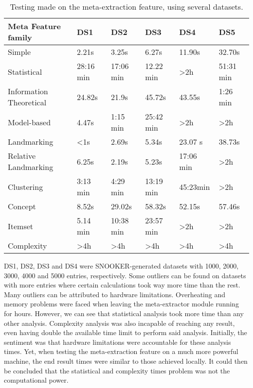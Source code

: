 \begin{table}[h!]
  \centering
  \caption{Testing made on the meta-extraction feature, using several datasets. }
  \setlength{\tabcolsep}{8pt}
    \renewcommand{\arraystretch}{1.2}
      \begin{tabular}{llllll}
        \hline
        Meta Feature family     & DS1       & DS2       & DS3       & DS4       & DS5 \\ \hline
        Simple                  & 2.21s     & 3.25s     & 6.27s     & 11.90s    & 32.70s\\
        Statistical             & 28:16 min & 17:06 min & 12.22 min & >2h       & 51:31 min\\
        Information Theoretical & 24.82s    & 21.9s     & 45.72s    & 43.55s    & 1:26 min\\
        Model-based             & 4.47s     & 1:15 min  & 25:42 min & >2h       & >2h \\
        Landmarking             & <1s       & 2.69s     & 5.34s     & 23.07 s   & 38.73s \\
        Relative Landmarking    & 6.25s     & 2.19s     & 5.23s     & 17:06 min & >2h \\
        Clustering              & 3:13 min  & 4:29 min  & 13:19 min & 45:23min  & >2h \\
        Concept                 & 8.52s     & 29.02s    & 58.32s    & 52.15s    & 57.46s\\
        Itemset                 & 5.14 min  & 10:38 min & 23:57 min & >2h       & >2h\\
        Complexity              & >4h       & >4h       & >4h       & >4h       & >4h \\\hline
  \end{tabular}
  \label{tab:analysis_time}
\end{table}

DS1, DS2, DS3 and DS4 were SNOOKER-generated datasets with 1000, 2000, 3000, 4000 and 5000 entries, respectively. Some outliers can be found on datasets with more entries where certain calculations took way more time than the rest. Many outliers can be attributed to hardware limitations. Overheating and memory problems were faced when leaving the meta-extractor module running for hours. However, we can see that statistical analysis took more time than any other analysis. Complexity analysis was also incapable of reaching any result, even having double the available time limit to perform said analysis. Initially, the sentiment was that hardware limitations were accountable for these analysis times. Yet, when testing the meta-extraction feature on a much more powerful machine, the end result times were similar to those achieved locally. It could then be concluded that the statistical and complexity times problem was not the computational power. 

